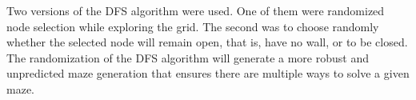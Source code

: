 Two versions of the DFS algorithm were used. One of them were randomized node selection while exploring the grid.
The second was to choose randomly whether the selected node will remain open, that is, have no wall, or to be closed.
The randomization of the DFS algorithm will generate a more robust and unpredicted maze generation that ensures 
there are multiple ways to solve a given maze.\cite{CLRS}






